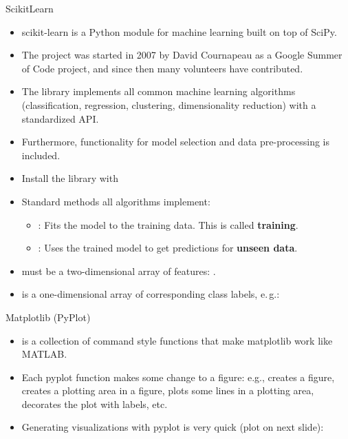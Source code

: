 \begin{dwHeaderFrame}{ScikitLearn}
	\begin{itemize}
		\item scikit-learn is a Python module for machine learning built on top of SciPy.
		\item The project was started in 2007 by David Cournapeau as a Google Summer of Code project, and since then many volunteers have contributed.
		\item The library implements all common machine learning algorithms (classification, regression, clustering, dimensionality reduction)
			with a standardized API.
		\item Furthermore, functionality for model selection and data pre-processing is included.
		\item Install the library with 
		\item Standard methods all algorithms implement:
		\begin{itemize}
			\item {}: Fits the model to the training data. This is called \textbf{training}.
			\item {}: Uses the trained model to get predictions for \textbf{unseen data}.
		\end{itemize}
	\end{itemize}
\end{dwHeaderFrame}


\begin{frame}
	
\end{frame}


\begin{frame}
	\begin{itemize}
		\item {} must be a two-dimensional array of features: .
		\item {} is a one-dimensional array of corresponding class labels, e.\,g.: 
	\end{itemize}
	
\end{frame}


\begin{dwHeaderFrame}{Matplotlib (PyPlot)}
	\begin{itemize}
		\item {} is a collection of command style functions that make matplotlib work like MATLAB.
		\item Each pyplot function makes some change to a figure: e.g., creates a figure, creates a plotting area in a figure,
			plots some lines in a plotting area, decorates the plot with labels, etc.
		\item Generating visualizations with pyplot is very quick (plot on next slide):
	\end{itemize}
	
\end{dwHeaderFrame}


